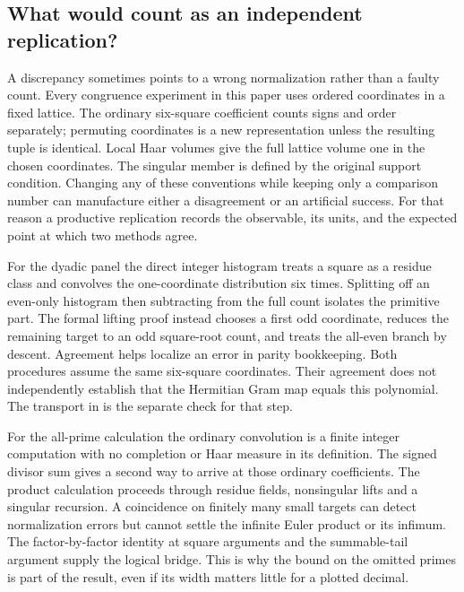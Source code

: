 \documentclass[12pt,letterpaper]{article}
\newcommand{\code}[1]{\texttt{\detokenize{#1}}}
\begin{document}
\subsection{What would count as an independent replication?}
A discrepancy sometimes points to a wrong normalization rather than a faulty count. Every congruence experiment in this paper uses ordered coordinates in a fixed lattice. The ordinary six-square coefficient counts signs and order separately; permuting coordinates is a new representation unless the resulting tuple is identical. Local Haar volumes give the full lattice volume one in the chosen coordinates. The singular member is defined by the original support condition. Changing any of these conventions while keeping only a comparison number can manufacture either a disagreement or an artificial success. For that reason a productive replication records the observable, its units, and the expected point at which two methods agree.

For the dyadic panel the direct integer histogram treats a square as a residue class and convolves the one-coordinate distribution six times. Splitting off an even-only histogram then subtracting from the full count isolates the primitive part. The formal lifting proof instead chooses a first odd coordinate, reduces the remaining target to an odd square-root count, and treats the all-even branch by descent. Agreement helps localize an error in parity bookkeeping. Both procedures assume the same six-square coordinates. Their agreement does not independently establish that the Hermitian Gram map equals this polynomial. The transport in \code{GaussianDilates.lean} is the separate check for that step.

For the all-prime calculation the ordinary convolution is a finite integer computation with no completion or Haar measure in its definition. The signed divisor sum gives a second way to arrive at those ordinary coefficients. The product calculation proceeds through residue fields, nonsingular lifts and a singular recursion. A coincidence on finitely many small targets can detect normalization errors but cannot settle the infinite Euler product or its infimum. The factor-by-factor identity at square arguments and the summable-tail argument supply the logical bridge. This is why the bound on the omitted primes is part of the result, even if its width matters little for a plotted decimal.
\end{document}

